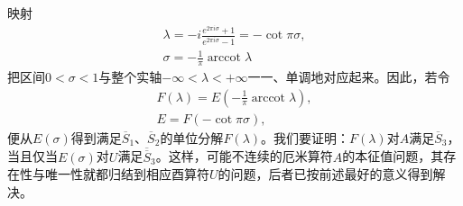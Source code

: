 \documentclass[fontsize=13pt,twoside,openany,headings=normal,parskip=false,bookmarkpackage=false,DIV=calc]{scrbook}
\begin{document}
\hypertarget{origpage-82}{}\label{origpage-82}映射
\begin{gather*}
\lambda=-i\frac{e^{2\pi i\sigma}+1}{e^{2\pi i\sigma}-1}=-\cot\pi\sigma,\\
 \sigma=-\frac1\pi\operatorname{arccot}\lambda
\end{gather*}
把区间$0<\sigma<1$与整个实轴$-\infty<\lambda<+\infty$一一、单调地对应起来。因此，若令
\begin{equation}
\begin{gathered}
F(\lambda)=E\left(-\frac1\pi\operatorname{arccot}\lambda\right),\\
E=F(-\cot\pi\sigma),
\end{gathered}
\tag{C}\label{eq:II.9.C}
\end{equation}
便从$E(\sigma)$得到满足$\hyperref[cond:II.Sbar1]{\overline S_1}$、$\hyperref[cond:II.Sbar2]{\overline S_2}$的单位分解$F(\lambda)$。我们要证明：$F(\lambda)$对$A$满足$\hyperref[cond:II.Sbar3]{\overline S_3}$，当且仅当$E(\sigma)$对$U$满足$\hyperref[cond:II.Sdouble3]{\overline{\overline S}_3}$。这样，可能不连续的厄米算符$A$的本征值问题，其存在性与唯一性就都归结到相应酉算符$U$的问题，后者已按前述最好的意义得到解决。
\end{document}

